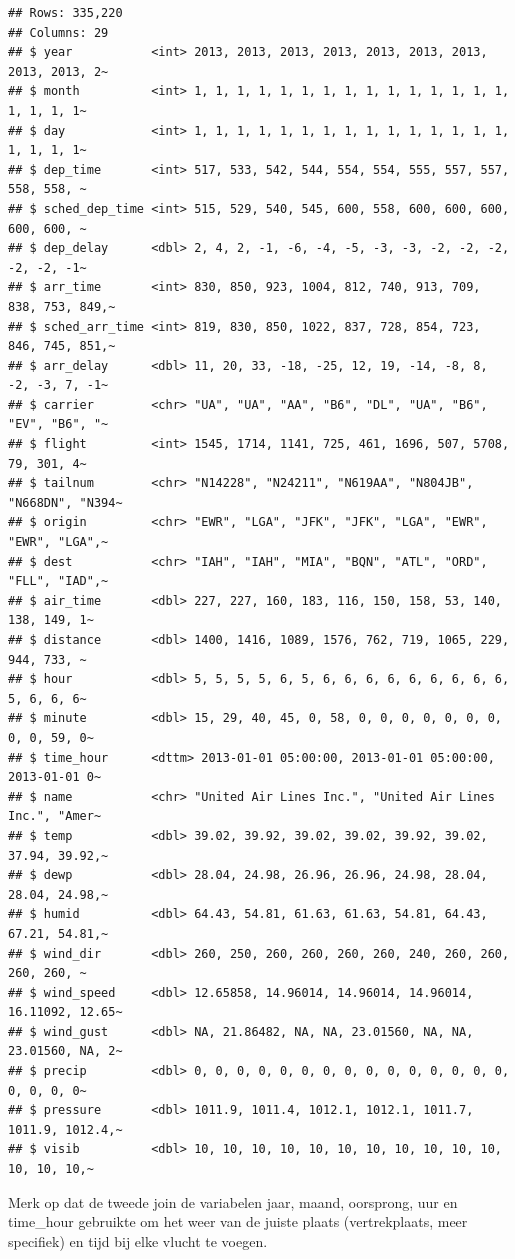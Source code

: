 \documentclass[]{tufte-book}
\begin{document}
\begin{verbatim}
## Rows: 335,220
## Columns: 29
## $ year           <int> 2013, 2013, 2013, 2013, 2013, 2013, 2013, 2013, 2013, 2~
## $ month          <int> 1, 1, 1, 1, 1, 1, 1, 1, 1, 1, 1, 1, 1, 1, 1, 1, 1, 1, 1~
## $ day            <int> 1, 1, 1, 1, 1, 1, 1, 1, 1, 1, 1, 1, 1, 1, 1, 1, 1, 1, 1~
## $ dep_time       <int> 517, 533, 542, 544, 554, 554, 555, 557, 557, 558, 558, ~
## $ sched_dep_time <int> 515, 529, 540, 545, 600, 558, 600, 600, 600, 600, 600, ~
## $ dep_delay      <dbl> 2, 4, 2, -1, -6, -4, -5, -3, -3, -2, -2, -2, -2, -2, -1~
## $ arr_time       <int> 830, 850, 923, 1004, 812, 740, 913, 709, 838, 753, 849,~
## $ sched_arr_time <int> 819, 830, 850, 1022, 837, 728, 854, 723, 846, 745, 851,~
## $ arr_delay      <dbl> 11, 20, 33, -18, -25, 12, 19, -14, -8, 8, -2, -3, 7, -1~
## $ carrier        <chr> "UA", "UA", "AA", "B6", "DL", "UA", "B6", "EV", "B6", "~
## $ flight         <int> 1545, 1714, 1141, 725, 461, 1696, 507, 5708, 79, 301, 4~
## $ tailnum        <chr> "N14228", "N24211", "N619AA", "N804JB", "N668DN", "N394~
## $ origin         <chr> "EWR", "LGA", "JFK", "JFK", "LGA", "EWR", "EWR", "LGA",~
## $ dest           <chr> "IAH", "IAH", "MIA", "BQN", "ATL", "ORD", "FLL", "IAD",~
## $ air_time       <dbl> 227, 227, 160, 183, 116, 150, 158, 53, 140, 138, 149, 1~
## $ distance       <dbl> 1400, 1416, 1089, 1576, 762, 719, 1065, 229, 944, 733, ~
## $ hour           <dbl> 5, 5, 5, 5, 6, 5, 6, 6, 6, 6, 6, 6, 6, 6, 6, 5, 6, 6, 6~
## $ minute         <dbl> 15, 29, 40, 45, 0, 58, 0, 0, 0, 0, 0, 0, 0, 0, 0, 59, 0~
## $ time_hour      <dttm> 2013-01-01 05:00:00, 2013-01-01 05:00:00, 2013-01-01 0~
## $ name           <chr> "United Air Lines Inc.", "United Air Lines Inc.", "Amer~
## $ temp           <dbl> 39.02, 39.92, 39.02, 39.02, 39.92, 39.02, 37.94, 39.92,~
## $ dewp           <dbl> 28.04, 24.98, 26.96, 26.96, 24.98, 28.04, 28.04, 24.98,~
## $ humid          <dbl> 64.43, 54.81, 61.63, 61.63, 54.81, 64.43, 67.21, 54.81,~
## $ wind_dir       <dbl> 260, 250, 260, 260, 260, 260, 240, 260, 260, 260, 260, ~
## $ wind_speed     <dbl> 12.65858, 14.96014, 14.96014, 14.96014, 16.11092, 12.65~
## $ wind_gust      <dbl> NA, 21.86482, NA, NA, 23.01560, NA, NA, 23.01560, NA, 2~
## $ precip         <dbl> 0, 0, 0, 0, 0, 0, 0, 0, 0, 0, 0, 0, 0, 0, 0, 0, 0, 0, 0~
## $ pressure       <dbl> 1011.9, 1011.4, 1012.1, 1012.1, 1011.7, 1011.9, 1012.4,~
## $ visib          <dbl> 10, 10, 10, 10, 10, 10, 10, 10, 10, 10, 10, 10, 10, 10,~
\end{verbatim}

Merk op dat de tweede join de variabelen jaar, maand, oorsprong, uur en time\_hour gebruikte om het weer van de juiste plaats (vertrekplaats, meer specifiek) en tijd bij elke vlucht te voegen.
\end{document}

